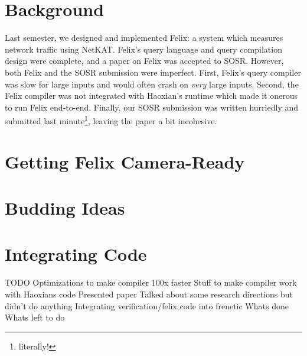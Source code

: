 \section{Background}
Last semester, we designed and implemented Felix: a system which measures
network traffic using NetKAT. Felix's query language and query compilation
design were complete, and a paper on Felix was accepted to SOSR. However,
both Felix and the SOSR submission were imperfect. First, Felix's query
compiler was slow for large inputs and would often crash on \emph{very} large
inputs. Second, the Felix compiler was not integrated with Haoxian's runtime
which made it onerous to run Felix end-to-end. Finally, our SOSR submission was
written hurriedly and submitted last minute\footnote{literally!}, leaving the
paper a bit incohesive.

\section{Getting Felix Camera-Ready}
\section{Budding Ideas}
\section{Integrating Code}

TODO
Optimizations to make compiler 100x faster
Stuff to make compiler work with Haoxians code
Presented paper
Talked about some research directions but didn’t do anything
Integrating verification/felix code into frenetic
Whats done
Whats left to do
